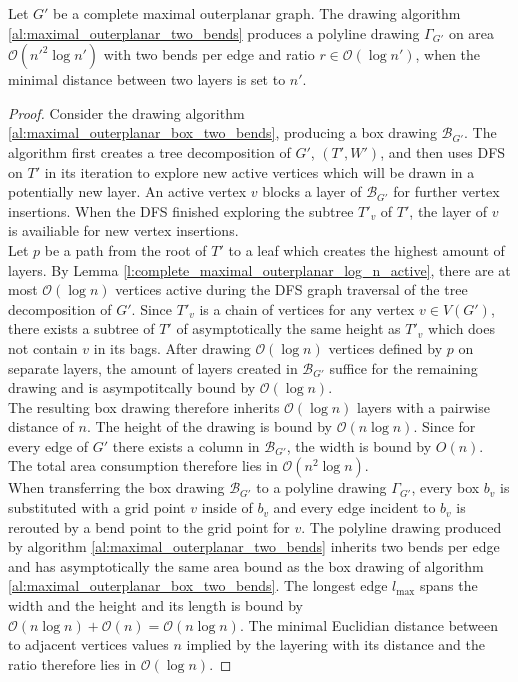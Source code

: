 \begin{theorem}
	Let $G'$ be a complete maximal outerplanar graph. The drawing algorithm \ref{al:maximal_outerplanar_two_bends} produces a polyline drawing $\Gamma_{G'}$ on area $\mathcal{O}(n'^2 \log n')$ with two bends per edge and ratio $r \in \mathcal{O}(\log n')$, when the minimal distance between two layers is set to $n'$.\label{th:complete_maximal_outerplanar_ratio_logn}
\end{theorem}
\begin{proof}
	Consider the drawing algorithm \ref{al:maximal_outerplanar_box_two_bends}, producing a box drawing $\mathcal{B}_{G'}$. The algorithm first creates a tree decomposition of $G'$, $(T',W')$, and then uses DFS on $T'$ in its iteration to explore new active vertices which will be drawn in a potentially new layer. An active vertex $v$ blocks a layer of $\mathcal{B}_{G'}$ for further vertex insertions. When the DFS finished exploring the subtree $T'_{v}$ of $T'$, the layer of $v$ is availiable for new vertex insertions.\\
	Let $p$ be a path from the root of $T'$ to a leaf which creates the highest amount of layers. By Lemma \ref{l:complete_maximal_outerplanar_log_n_active}, there are at most $\mathcal{O}(\log n)$ vertices active during the DFS graph traversal of the tree decomposition of $G'$. Since $T'_{v}$ is a chain of vertices for any vertex $v\in V(G')$, there exists a subtree of $T'$ of asymptotically the same height as $T'_{v}$ which does not contain $v$ in its bags. After drawing $\mathcal{O}(\log n)$ vertices defined by $p$ on separate layers, the amount of layers created in $\mathcal{B}_{G'}$ suffice for the remaining drawing and is asympotitcally bound by $\mathcal{O}(\log n)$.\\
	The resulting box drawing therefore inherits $\mathcal{O}(\log n)$ layers with a pairwise distance of $n$. The height of the drawing is bound by $\mathcal{O}(n \log n)$. Since for every edge of $G'$ there exists a column in $\mathcal{B}_{G'}$, the width is bound by $O(n)$. The total area consumption therefore lies in $\mathcal{O}(n^2 \log n)$.\\
	When transferring the box drawing $\mathcal{B}_{G'}$ to a polyline drawing $\Gamma_{G'}$, every box $b_v$ is substituted with a grid point $v$ inside of $b_v$ and every edge incident to $b_v$ is rerouted by a bend point to the grid point for $v$. The polyline drawing produced by algorithm \ref{al:maximal_outerplanar_two_bends} inherits two bends per edge and has asymptotically the same area bound as the box drawing of algorithm \ref{al:maximal_outerplanar_box_two_bends}. The longest edge $l_{\max}$ spans the width and the height and its length is bound by $\mathcal{O}(n \log n) + \mathcal{O}(n) = \mathcal{O}(n \log n)$. The minimal Euclidian distance between to adjacent vertices values $n$ implied by the layering with its distance and the ratio therefore lies in $\mathcal{O}(\log n)$.
\end{proof}

